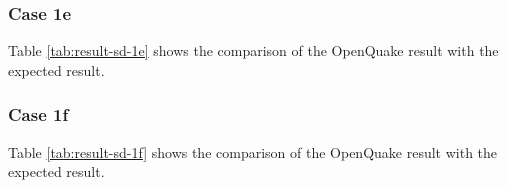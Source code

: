 \subsubsection{Case 1e}


Table \ref{tab:result-sd-1e} shows the comparison of the OpenQuake result with the expected result.
\subsubsection{Case 1f}


Table \ref{tab:result-sd-1f} shows the comparison of the OpenQuake result with the expected result.
